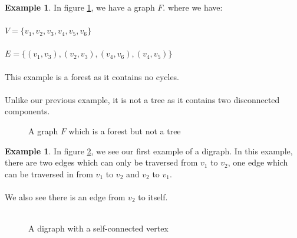 \documentclass[11pt,reqno]{amsart}
\theoremstyle{definition}
\newtheorem{example}[thm]{Example}
\numberwithin{equation}{section}
\begin{document}
\begin{example}
	In figure \ref{fig:ForestTwo}, we have a graph $F$. where we have:\\ \\$V=\{v_1,v_2,v_3,v_4,v_5, v_6\}$
	\\
	\\$E=\{ (v_1, v_3) , (v_2, v_3), (v_4,v_6),(v_4,v_5)\}$\\
	\\
	This example is a forest as it contains no cycles.\\
	\\
	 Unlike our previous example, it is not a tree as it contains two disconnected components.
	\begin{figure}[h!]
		\caption{A graph $F$ which is a forest but not a tree}
		\label{fig:ForestTwo}
	\end{figure}
\end{example}

\begin{example}
	In figure \ref{fig:Digraph}, we see our first example of a digraph. In this example, there are two edges which can only be traversed from $v_1$ to $v_2$, one edge which can be traversed in from $v_1$ to $v_2$ and $v_2$ to $v_1$. \\
	\\
	We also see there is an edge from $v_2$ to itself.\\
	\\
	\begin{figure}[h!]
		\caption{A digraph with a self-connected vertex}
		\label{fig:Digraph}
	\end{figure}
\end{example}
\end{document}
